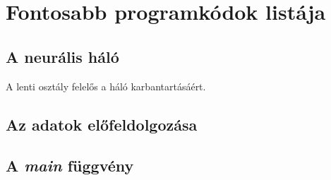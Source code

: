 \chapter{Fontosabb programkódok listája}\label{ch:program}

\lstset{language=C++}

\section{A neurális háló}
A lenti osztály felelős a háló karbantartásáért.



\section{Az adatok előfeldolgozása}



\section{A \textit{main} függvény}

